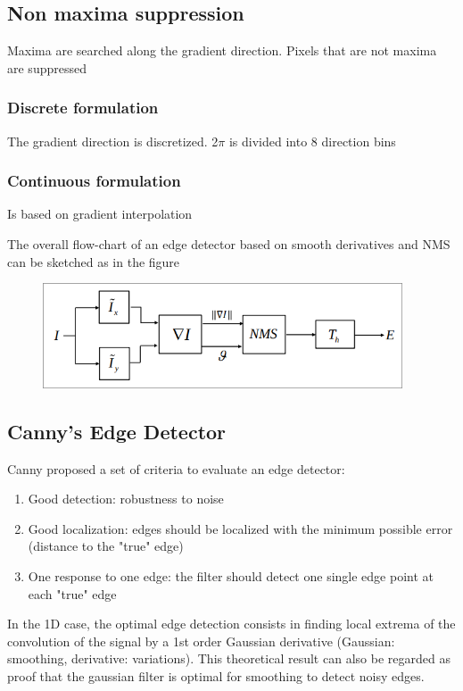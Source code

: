 \documentclass{article}
\begin{document}
\subsection{Non maxima suppression}
Maxima are searched along the gradient direction. Pixels that are not maxima are suppressed
\subsubsection{Discrete formulation}
The gradient direction is discretized. 2$\pi$ is divided into 8 direction bins 
\subsubsection{Continuous formulation}
Is based on gradient interpolation

The overall flow-chart of an edge detector based on smooth derivatives and NMS can be sketched as in the figure 
\begin{figure}[!ht]
    \begin{center}
        \includegraphics[width=0.95\textwidth]{smoothedging}
    \end{center}
    \label{fig:sedge}
\end{figure}

\subsection{Canny's Edge Detector}
Canny proposed a set of criteria to evaluate an edge detector:
\begin{enumerate}
    \item Good detection: robustness to noise
    \item Good localization: edges should be localized with the minimum possible error (distance to the "true" edge)
    \item One response to one edge: the filter should detect one single edge point at each "true" edge
\end{enumerate}
In the 1D case, the optimal edge detection consists in finding local extrema of the convolution of the signal by a 1st order Gaussian derivative (Gaussian: smoothing, derivative: variations). This theoretical result can also be regarded as proof that the gaussian filter is optimal for smoothing to detect noisy edges.
\end{document}
